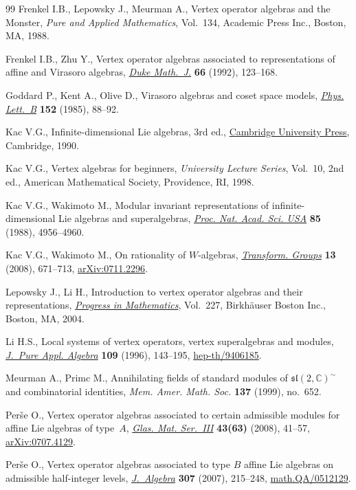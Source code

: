 \documentclass[pdftex]{sigma}
\begin{document}
\begin{thebibliography}{99}
Frenkel I.B., Lepowsky J., Meurman A., Vertex operator algebras and the
  {M}onster, \textit{Pure and Applied Mathematics}, Vol.~134, Academic Press
  Inc., Boston, MA, 1988.


Frenkel I.B., Zhu Y., Vertex operator algebras associated to representations of
  af\/f\/ine and {V}irasoro algebras, \href{http://dx.doi.org/10.1215/S0012-7094-92-06604-X}{\textit{Duke Math.~J.}} \textbf{66} (1992),
  123--168.

Goddard P., Kent A., Olive D., Virasoro algebras and coset space models,
  \href{http://dx.doi.org/10.1016/0370-2693(85)91145-1}{\textit{Phys. Lett.~B}} \textbf{152} (1985), 88--92.

Kac V.G., Inf\/inite-dimensional {L}ie algebras, 3rd ed., \href{http://dx.doi.org/10.1017/CBO9780511626234}{Cambridge University
  Press}, Cambridge, 1990.

Kac V.G., Vertex algebras for beginners, \textit{University Lecture Series},
  Vol.~10, 2nd ed., American Mathematical Society, Providence, RI, 1998.


Kac V.G., Wakimoto M., Modular invariant representations of
  inf\/inite-dimensional {L}ie algebras and superalgebras, \href{http://dx.doi.org/10.1073/pnas.85.14.4956}{\textit{Proc. Nat.
  Acad. Sci. USA}} \textbf{85} (1988), 4956--4960.

Kac V.G., Wakimoto M., On rationality of {$W$}-algebras, \href{http://dx.doi.org/10.1007/s00031-008-9028-7}{\textit{Transform.
  Groups}} \textbf{13} (2008), 671--713, \href{http://arxiv.org/abs/0711.2296}{arXiv:0711.2296}.

Lepowsky J., Li H., Introduction to vertex operator algebras and their
  representations, \href{http://dx.doi.org/10.1007/978-0-8176-8186-9}{\textit{Progress in Mathematics}}, Vol.~227, Birkh\"auser
  Boston Inc., Boston, MA, 2004.

Li H.S., Local systems of vertex operators, vertex superalgebras and modules,
  \href{http://dx.doi.org/10.1016/0022-4049(95)00079-8}{\textit{J.~Pure Appl. Algebra}} \textbf{109} (1996), 143--195,
  \href{http://arxiv.org/abs/hep-th/9406185}{hep-th/9406185}.

Meurman A., Primc M., Annihilating f\/ields of standard modules of
  {${\mathfrak{sl}}(2,{\mathbb C})^\sim$} and combinatorial identities,
  \textit{Mem. Amer. Math. Soc.} \textbf{137} (1999), no.~652.


Per{\v{s}}e O., Vertex operator algebras associated to certain admissible
  modules for af\/f\/ine {L}ie algebras of type~{$A$}, \href{http://dx.doi.org/10.3336/gm.43.1.05}{\textit{Glas. Mat. Ser.~III}}
  \textbf{43(63)} (2008), 41--57, \href{http://arxiv.org/abs/0707.4129}{arXiv:0707.4129}.

Per{\v{s}}e O., Vertex operator algebras associated to type {$B$} af\/f\/ine {L}ie
  algebras on admissible half-integer levels, \href{http://dx.doi.org/10.1016/j.jalgebra.2006.05.004}{\textit{J.~Algebra}} \textbf{307}
  (2007), 215--248, \href{http://arxiv.org/abs/math.QA/0512129}{math.QA/0512129}.

\end{thebibliography}\LastPageEnding
\end{document}
